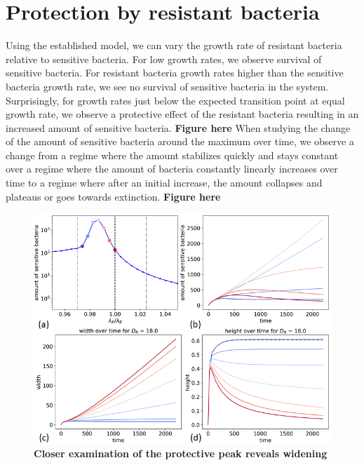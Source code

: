 \section{Protection by resistant bacteria}
Using the established model, we can vary the growth rate of resistant bacteria relative to sensitive bacteria. For low growth rates, we observe survival of sensitive bacteria. For resistant bacteria growth rates higher than the sensitive bacteria growth rate, we see no survival of sensitive bacteria in the system. Surprisingly, for growth rates just below the expected transition point at equal growth rate, we observe a protective effect of the resistant bacteria resulting in an increased amount of sensitive bacteria. \textbf{Figure here} When studying the change of the amount of sensitive bacteria around the maximum over time, we observe a change from a regime where the amount stabilizes quickly and stays constant over a regime where the amount of bacteria constantly linearly increases over time to a regime where after an initial increase, the amount collapses and plateaus or goes towards extinction. \textbf{Figure here} 

\begin{figure}
\centering
\includegraphics[width=\linewidth]{graphics/2025_09_26_droplets_fig3.png}
\caption{\textbf{Closer examination of the protective peak reveals widening}}
\label{fig:results_peak_change_height_width}
\end{figure}

